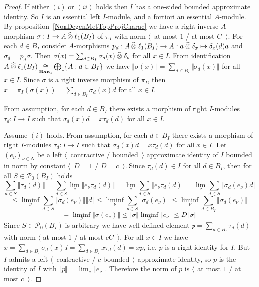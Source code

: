 \begin{proof} If either $(i)$ or $(ii)$ holds then $I$ has a one-sided bounded
approximate identity. So $I$ is an essential left $I$-module, and a fortiori an
essential $A$-module. By proposition~\ref{NonDegenMetTopProjCharac} we have a
right inverse $A$-morphism $\sigma:I\to A\mathbin{\widehat{\otimes}} \ell_1(B_I)$ of $\pi_I$ with
norm  $\langle$~at most $1$ / at most $C$~$\rangle$. For each $d\in B_I$
consider $A$-morphisms $p_d:A\mathbin{\widehat{\otimes}} \ell_1(B_I)\to A:a\mathbin{\widehat{\otimes}}
\delta_x\mapsto \delta_x(d)a$ and $\sigma_d=p_d\sigma$. Then
$\sigma(x)=\sum_{d\in B_I}\sigma_d(x)\mathbin{\widehat{\otimes}} \delta_d$ for all $x\in I$. From
identification 
$A\mathbin{\widehat{\otimes}}\ell_1(B_I)\mathop{\mathbin{\cong}}\limits_{\mathbf{Ban}_1}\bigoplus_1 \{A:d\in B_I \}$ 
we have $\Vert\sigma(x)\Vert=\sum_{d\in B_I} \Vert\sigma_d(x)\Vert$ for
all $x\in I$. Since $\sigma$ is a right inverse morphism of $\pi_I$, then
$x=\pi_I(\sigma(x))=\sum_{d\in B_I}\sigma_d(x)d$ for all $x\in I$. 

From assumption, for each $d\in B_I$ there exists a morphism of right
$I$-modules $\tau_d:I\to I$ such that $\sigma_d(x)d=x\tau_d(d)$ for all 
$x\in I$. 

Assume $(i)$ holds. From assumption, for each $d\in B_I$ there exists a morphism
of right $I$-modules $\tau_d:I\to I$ such that $\sigma_d(x)d=x\tau_d(d)$ for all
$x\in I$.  Let ${(e_\nu)}_{\nu\in N}$ be a left $\langle$~contractive /
bounded~$\rangle$ approximate identity of $I$ bounded in norm by constant
$\langle$~$D=1$ / $D=c$~$\rangle$. Since $\tau_d(d)\in I$ for all $d\in B_I$,
then for all $S\in\mathcal{P}_0(B_I)$ holds
$$
\sum_{d\in S}\Vert \tau_d(d)\Vert
=\sum_{d\in S}\lim_{\nu}\Vert e_\nu \tau_d(d) \Vert
=\lim_{\nu}\sum_{d\in S}\Vert e_\nu \tau_d(d)\Vert
=\lim_{\nu}\sum_{d\in S}\Vert \sigma_d(e_\nu)d \Vert
$$
$$
\leq\liminf_{\nu}\sum_{d\in S}\Vert\sigma_d(e_\nu)\Vert\Vert d\Vert 
\leq\liminf_{\nu}\sum_{d\in S}\Vert\sigma_d(e_\nu)\Vert
\leq\liminf_{\nu}\sum_{d\in B_I}\Vert\sigma_d(e_\nu)\Vert
$$
$$
=\liminf_{\nu}\Vert\sigma(e_\nu)\Vert
\leq\Vert\sigma\Vert\liminf_{\nu}\Vert e_\nu\Vert
\leq D\Vert\sigma\Vert 
$$
Since $S\in \mathcal{P}_0(B_I)$ is arbitrary we have well defined element
$p=\sum_{d\in B_I}\tau_d(d)$ with norm $\langle$ at most $1$ / at most
$cC$~$\rangle$. For all $x\in I$ we have $x=\sum_{d\in
B_I}\sigma_d(x)d=\sum_{d\in B_I}x\tau_d(d)=xp$, i.e. $p$ is a right identity for
$I$. But $I$ admits a left $\langle$~contractive / $c$-bounded~$\rangle$
approximate identity, so $p$ is the identity of $I$ with $\Vert
p\Vert=\lim_\nu\Vert e_\nu\Vert$. Therefore the norm of $p$ is $\langle$~at most
$1$ / at most $c$~$\rangle$.


\end{proof}
